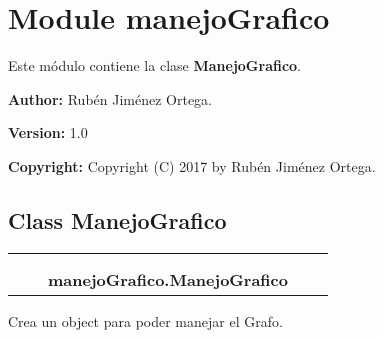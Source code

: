 %
%
%


\section{Module manejoGrafico}

    \label{manejoGrafico}
Este módulo contiene la clase \textbf{ManejoGrafico}.

\textbf{Author:} Rubén Jiménez Ortega.



\textbf{Version:} 1.0



\textbf{Copyright:} Copyright (C) 2017 by Rubén Jiménez Ortega.





\subsection{Class ManejoGrafico}

    \label{manejoGrafico:ManejoGrafico}
\begin{tabular}{cccccc}
\multicolumn{2}{r}{\settowidth{\BCL}{object}\multirow{2}{\BCL}{object}}
&&
  \\\cline{3-3}
  &&\multicolumn{1}{c|}{}
&&
  \\
&&\multicolumn{2}{l}{\textbf{manejoGrafico.ManejoGrafico}}
\end{tabular}

Crea un object para poder manejar el Grafo.



